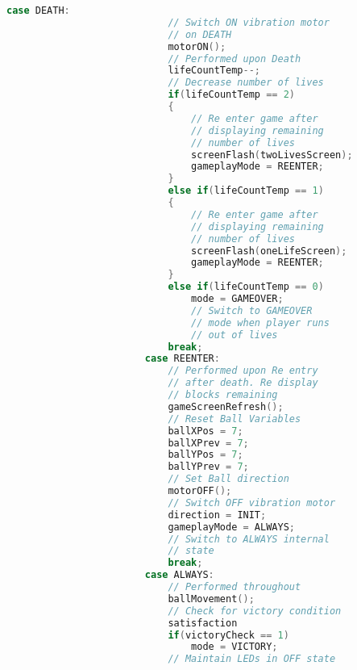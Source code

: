 \documentclass{article}
\begin{document}
\begin{lstlisting}[basicstyle = \small, language = C]
                        case DEATH:
                            // Switch ON vibration motor 
                            // on DEATH
                            motorON();
                            // Performed upon Death
                            lifeCountTemp--; 
                            // Decrease number of lives
                            if(lifeCountTemp == 2)
                            {
                                // Re enter game after 
                                // displaying remaining 
                                // number of lives
                                screenFlash(twoLivesScreen);
                                gameplayMode = REENTER;
                            }
                            else if(lifeCountTemp == 1)
                            {
                                // Re enter game after 
                                // displaying remaining 
                                // number of lives
                                screenFlash(oneLifeScreen);
                                gameplayMode = REENTER;
                            }
                            else if(lifeCountTemp == 0)
                                mode = GAMEOVER;
                                // Switch to GAMEOVER 
                                // mode when player runs 
                                // out of lives
                            break;
                        case REENTER:
                            // Performed upon Re entry 
                            // after death. Re display 
                            // blocks remaining
                            gameScreenRefresh(); 
                            // Reset Ball Variables
                            ballXPos = 7;
                            ballXPrev = 7;
                            ballYPos = 7;
                            ballYPrev = 7;
                            // Set Ball direction
                            motorOFF(); 
                            // Switch OFF vibration motor
                            direction = INIT;
                            gameplayMode = ALWAYS; 
                            // Switch to ALWAYS internal 
                            // state
                            break;
                        case ALWAYS:
                            // Performed throughout
                            ballMovement();
                            // Check for victory condition 
                            satisfaction
                            if(victoryCheck == 1)
                                mode = VICTORY;
                            // Maintain LEDs in OFF state

\end{lstlisting}
\end{document}
